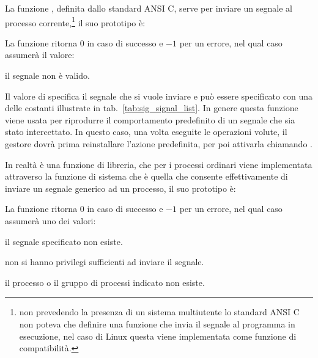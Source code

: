 La funzione , definita dallo standard ANSI C, serve per inviare
un segnale al processo corrente,\footnote{non prevedendo la presenza di un
  sistema multiutente lo standard ANSI C non poteva che definire una funzione
  che invia il segnale al programma in esecuzione, nel caso di Linux questa
  viene implementata come funzione di compatibilità.}  il suo prototipo è:

\begin{funcproto}{
}

{La funzione ritorna $0$ in caso di successo e $-1$ per un errore, nel qual
  caso  assumerà il valore: 
  \begin{errlist}
  \item[\errcode{EINVAL}] il segnale  non è valido.
  \end{errlist}
}
\end{funcproto}

Il valore di  specifica il segnale che si vuole inviare e può
essere specificato con una delle costanti illustrate in
tab.~\ref{tab:sig_signal_list}.  In genere questa funzione viene usata per
riprodurre il comportamento predefinito di un segnale che sia stato
intercettato. In questo caso, una volta eseguite le operazioni volute, il
gestore dovrà prima reinstallare l'azione predefinita, per poi attivarla
chiamando .

In realtà  è una funzione di libreria, che per i processi ordinari
viene implementata attraverso la funzione di sistema  che è quella
che consente effettivamente di inviare un segnale generico ad un processo, il
 suo prototipo è:

\begin{funcproto}{
}

{La funzione ritorna $0$ in caso di successo e $-1$ per un errore, nel qual
  caso  assumerà uno dei valori: 
  \begin{errlist}
    \item[\errcode{EINVAL}] il segnale specificato non esiste.
    \item[\errcode{EPERM}] non si hanno privilegi sufficienti ad inviare il
      segnale.
    \item[\errcode{ESRCH}] il processo o il gruppo di processi indicato non
      esiste.
  \end{errlist}
}
\end{funcproto}

